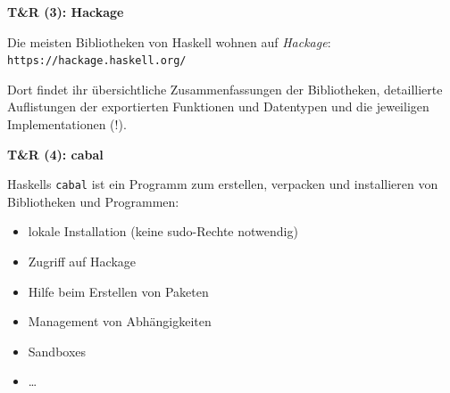 \documentclass[unknownkeysallowed]{beamer}
\begin{document}
  
  \begin{frame}
    \Large\textbf{T\&R (3): Hackage}\bigskip \normalsize
    
    Die meisten Bibliotheken von Haskell wohnen auf \emph{Hackage}: \\ \bigskip \texttt{https://hackage.haskell.org/}
    
    Dort findet ihr übersichtliche Zusammenfassungen der Bibliotheken, detaillierte Auflistungen der exportierten Funktionen und Datentypen und die jeweiligen Implementationen (!).
  \end{frame}
  
  
  \begin{frame}
    \Large\textbf{T\&R (4): cabal}\bigskip \normalsize
    
    Haskells \texttt{cabal} ist ein Programm zum erstellen, verpacken und installieren
    von Bibliotheken und Programmen:
    
    \begin{itemize}
    \item lokale Installation (keine sudo-Rechte notwendig)
    \item Zugriff auf Hackage 
    \item Hilfe beim Erstellen von Paketen
    \item Management von Abhängigkeiten
    \item Sandboxes
    \item \dots
    \end{itemize}
  \end{frame}
  
  
\end{document}
